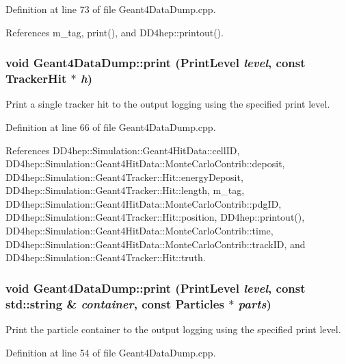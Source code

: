 Definition at line 73 of file Geant4DataDump.cpp.

References m\_\-tag, print(), and DD4hep::printout().\hypertarget{class_d_d4hep_1_1_simulation_1_1_geant4_data_dump_af3765022b8a03075fde40b2129b468e8}{
\subsubsection[{print}]{\setlength{\rightskip}{0pt plus 5cm}void Geant4DataDump::print ({\bf PrintLevel} {\em level}, \/  const {\bf TrackerHit} $\ast$ {\em h})}}
\label{class_d_d4hep_1_1_simulation_1_1_geant4_data_dump_af3765022b8a03075fde40b2129b468e8}


Print a single tracker hit to the output logging using the specified print level. 

Definition at line 66 of file Geant4DataDump.cpp.

References DD4hep::Simulation::Geant4HitData::cellID, DD4hep::Simulation::Geant4HitData::MonteCarloContrib::deposit, DD4hep::Simulation::Geant4Tracker::Hit::energyDeposit, DD4hep::Simulation::Geant4Tracker::Hit::length, m\_\-tag, DD4hep::Simulation::Geant4HitData::MonteCarloContrib::pdgID, DD4hep::Simulation::Geant4Tracker::Hit::position, DD4hep::printout(), DD4hep::Simulation::Geant4HitData::MonteCarloContrib::time, DD4hep::Simulation::Geant4HitData::MonteCarloContrib::trackID, and DD4hep::Simulation::Geant4Tracker::Hit::truth.\hypertarget{class_d_d4hep_1_1_simulation_1_1_geant4_data_dump_a50918352a7c46d20e94d26b4cf5d5e39}{
\subsubsection[{print}]{\setlength{\rightskip}{0pt plus 5cm}void Geant4DataDump::print ({\bf PrintLevel} {\em level}, \/  const std::string \& {\em container}, \/  const {\bf Particles} $\ast$ {\em parts})}}
\label{class_d_d4hep_1_1_simulation_1_1_geant4_data_dump_a50918352a7c46d20e94d26b4cf5d5e39}


Print the particle container to the output logging using the specified print level. 

Definition at line 54 of file Geant4DataDump.cpp.

